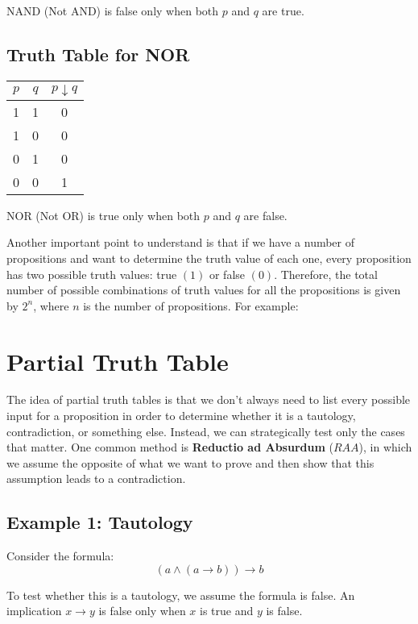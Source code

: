 \documentclass[12pt,a4paper,openany]{article}
\begin{document}
NAND (Not AND) is false only when both \(p\) and \(q\) are true.

\subsection{Truth Table for NOR}\label{truth-table-for-nor}

\begin{center}
\begin{tabular}{|c|c|c|}
\hline
\(p\) & \(q\) & \(p \downarrow q\) \\
\hline
1 & 1 & 0 \\
1 & 0 & 0 \\
0 & 1 & 0 \\
0 & 0 & 1 \\
\hline
\end{tabular}
\end{center}

NOR (Not OR) is true only when both \(p\) and \(q\) are false.

Another important point to understand is that if we have a number of propositions and want to determine the truth value of each one, every proposition has two possible truth values: true \((1)\) or false \((0)\). 
Therefore, the total number of possible combinations of truth values for all the propositions is given by \(2^n\), where \(n\) is the number of propositions. For example:


\section{Partial Truth Table}


The idea of partial truth tables is that we don't always need to list every possible input for a proposition in order to determine whether it is a tautology, contradiction, or something else. 
Instead, we can strategically test only the cases that matter. One common method is \textbf{Reductio ad Absurdum} ($RAA$), in which we assume the opposite of what we want to prove and then show that this assumption leads to a contradiction.

\subsection{Example 1: Tautology}

Consider the formula:
$$ (a \land (a \to b)) \to b $$

To test whether this is a tautology, we assume the formula is false. An implication $x \to y$ is false only when $x$ is true and $y$ is false.
\end{document}
